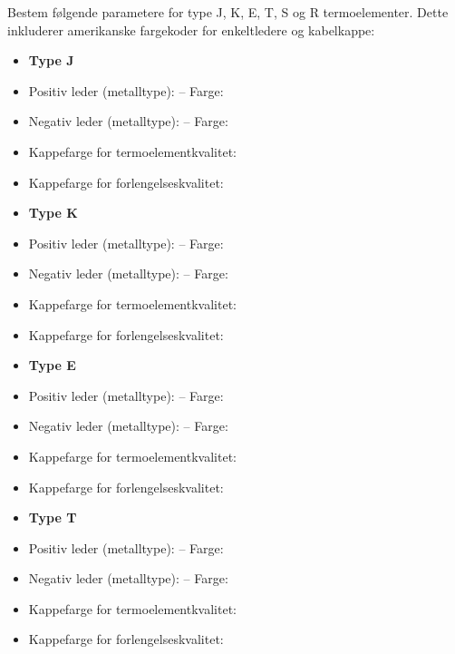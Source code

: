 
Bestem følgende parametere for type J, K, E, T, S og R termoelementer. Dette inkluderer amerikanske fargekoder for enkeltledere og kabelkappe:

\begin{itemize}
\item{} {\bf Type J}
\item{} Positiv leder (metalltype): \underbar{\hskip 50pt} -- Farge: \underbar{\hskip 50pt}
\item{} Negativ leder (metalltype): \underbar{\hskip 50pt} -- Farge: \underbar{\hskip 50pt}
\item{} Kappefarge for termoelementkvalitet: \underbar{\hskip 50pt}
\item{} Kappefarge for forlengelseskvalitet: \underbar{\hskip 50pt}
\end{itemize}

\begin{itemize}
\item{} {\bf Type K}
\item{} Positiv leder (metalltype): \underbar{\hskip 50pt} -- Farge: \underbar{\hskip 50pt}
\item{} Negativ leder (metalltype): \underbar{\hskip 50pt} -- Farge: \underbar{\hskip 50pt}
\item{} Kappefarge for termoelementkvalitet: \underbar{\hskip 50pt}
\item{} Kappefarge for forlengelseskvalitet: \underbar{\hskip 50pt}
\end{itemize}

\begin{itemize}
\item{} {\bf Type E}
\item{} Positiv leder (metalltype): \underbar{\hskip 50pt} -- Farge: \underbar{\hskip 50pt}
\item{} Negativ leder (metalltype): \underbar{\hskip 50pt} -- Farge: \underbar{\hskip 50pt}
\item{} Kappefarge for termoelementkvalitet: \underbar{\hskip 50pt}
\item{} Kappefarge for forlengelseskvalitet: \underbar{\hskip 50pt}
\end{itemize}

\begin{itemize}
\item{} {\bf Type T}
\item{} Positiv leder (metalltype): \underbar{\hskip 50pt} -- Farge: \underbar{\hskip 50pt}
\item{} Negativ leder (metalltype): \underbar{\hskip 50pt} -- Farge: \underbar{\hskip 50pt}
\item{} Kappefarge for termoelementkvalitet: \underbar{\hskip 50pt}
\item{} Kappefarge for forlengelseskvalitet: \underbar{\hskip 50pt}
\end{itemize}

